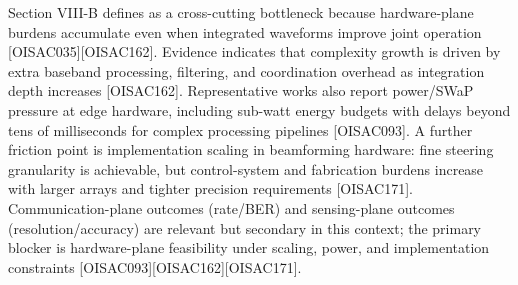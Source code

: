 {}Section VIII-B defines  as a cross-cutting bottleneck because hardware-plane burdens accumulate even when integrated waveforms improve joint operation [O\markdownRendererUnderscore{}ISAC\markdownRendererUnderscore{}035][O\markdownRendererUnderscore{}ISAC\markdownRendererUnderscore{}162]. Evidence indicates that complexity growth is driven by extra baseband processing, filtering, and coordination overhead as integration depth increases [O\markdownRendererUnderscore{}ISAC\markdownRendererUnderscore{}162]. Representative works also report power/SWaP pressure at edge hardware, including sub-watt energy budgets with delays beyond tens of milliseconds for complex processing pipelines [O\markdownRendererUnderscore{}ISAC\markdownRendererUnderscore{}093]. A further friction point is implementation scaling in beamforming hardware: fine steering granularity is achievable, but control-system and fabrication burdens increase with larger arrays and tighter precision requirements [O\markdownRendererUnderscore{}ISAC\markdownRendererUnderscore{}171]. Communication-plane outcomes (rate/BER) and sensing-plane outcomes (resolution/accuracy) are relevant but secondary in this context; the primary blocker is hardware-plane feasibility under scaling, power, and implementation constraints [O\markdownRendererUnderscore{}ISAC\markdownRendererUnderscore{}093][O\markdownRendererUnderscore{}ISAC\markdownRendererUnderscore{}162][O\markdownRendererUnderscore{}ISAC\markdownRendererUnderscore{}171].\markdownRendererInterblockSeparator
{}
\markdownRendererSectionEnd \markdownRendererSectionBegin
{}\markdownRendererInterblockSeparator
